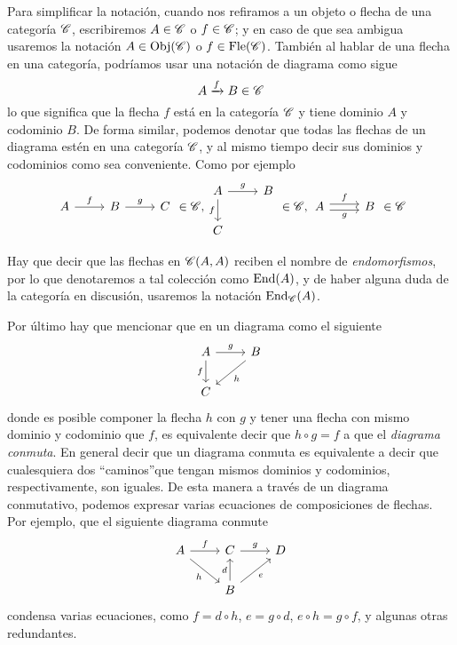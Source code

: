 \documentclass{comunicaciones}
\begin{document}
Para simplificar la notación, cuando nos refiramos a un objeto o flecha de una categoría $\mathscr C$, escribiremos $A\in\mathscr C$ o $f\in\mathscr C$; 
y en caso de que sea ambigua usaremos la notación $A\in\mathrm{Obj}(\mathscr C)$ o $f\in\mathrm{Fle}(\mathscr C)$. También al hablar de una flecha en una categoría, podríamos usar
una notación de diagrama como sigue $$A\xrightarrow{f}B\in\mathscr C$$
lo que significa que la flecha $f$ está en la categoría $\mathscr C$ y tiene dominio $A$ y codominio $B$. De forma similar, podemos denotar que todas
las flechas de un diagrama estén en una categoría $\mathscr C$, y al mismo tiempo decir sus dominios y codominios como sea conveniente. Como por ejemplo
$$\begin{tikzcd}
    A\arrow{r}{f} & B\arrow{r}{g} & C
\end{tikzcd}\in\C, 
\begin{tikzcd}
    A \arrow[d, "f"'] \arrow[r, "g"] & B \\
    C                                &  
\end{tikzcd}\in\C, 
\begin{tikzcd}
    A \arrow[r, "g"', shift right] \arrow[r, "f", shift left] & B
\end{tikzcd}\in\C$$

Hay que decir que las flechas en $\mathscr C(A,A)$ reciben el nombre
de \emph{endomorfismos}, por lo que denotaremos a tal colección como $\mathrm{End}(A)$, y de haber alguna duda de la categoría en discusión, usaremos la 
notación $\mathrm{End}_\mathscr C(A)$.

Por último hay que mencionar que en un diagrama como el siguiente
\[\begin{tikzcd}
    A \arrow[d, "f"'] \arrow[r, "g"] & B \arrow[ld, "h"] \\
    C                                &                  
    \end{tikzcd}\]
donde es posible componer la flecha $h$ con $g$ y tener una flecha con mismo dominio y codominio que $f$, es equivalente decir
que $h\circ g=f$ a que el \emph{diagrama conmuta}. En general decir que un diagrama conmuta es equivalente a decir que cualesquiera dos
\textquotedblleft caminos\textquotedblright que tengan mismos dominios y codominios, respectivamente, son iguales. De esta manera a través de un diagrama
conmutativo, podemos expresar varias ecuaciones de composiciones de flechas. Por ejemplo, que el siguiente diagrama conmute
\[\begin{tikzcd}
    A \arrow[rd, "h"'] \arrow[r, "f"] & C \arrow[r, "g"]                  & D \\
                                      & B \arrow[u, "d"] \arrow[ru, "e"'] &  
\end{tikzcd}\]
condensa varias ecuaciones, como $f=d\circ h$, $e=g\circ d$, $e\circ h=g\circ f$, y algunas otras redundantes.
\end{document}
